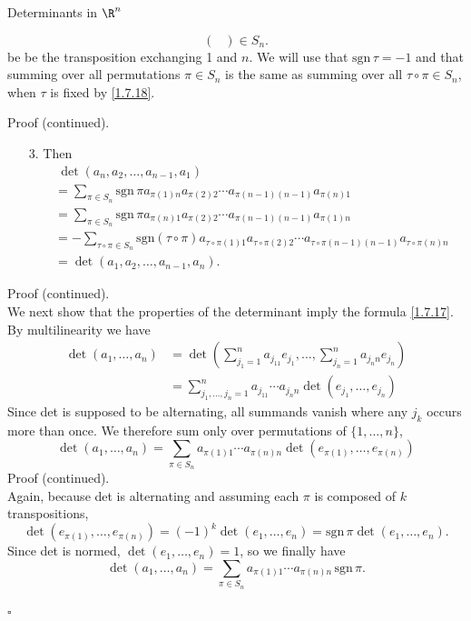 \documentclass[smaller,hyperref={CJKbookmarks=true}]{beamer}
\begin{document}
\begin{frame}{Determinants in $\R^n$}
\begin{spacing}{1.05}
\begin{itemize}
\begin{equation}
\begin{pmatrix}
             \end{pmatrix}\in S_n.
      \end{equation}
      be be the transposition exchanging 1 and $n$. We will use that $\text{sgn}\,\tau=-1$
      and that summing over all permutations $\pi\in S_n$ is the same as summing over all $\tau\circ\pi\in S_n$, when $\tau$ is fixed by \eqref{1.7.18}.
\end{itemize}
\newpage
\vspace*{20pt}
\alert{Proof (continued).}\\
\begin{itemize}
  \item[3.] Then
  \begin{equation*}
    \begin{split}
         &~\det(a_n,a_2,\ldots,a_{n-1},a_1)  \\
         &=\sum_{\pi\in S_n}\text{sgn}\,\pi a_{\pi(1)n}a_{\pi(2)2}\cdots a_{\pi(n-1)(n-1)}a_{\pi(n)1}  \\
         &=\sum_{\pi\in S_n}\text{sgn}\,\pi a_{\pi(n)1}a_{\pi(2)2}\cdots a_{\pi(n-1)(n-1)}a_{\pi(1)n}  \\
         &=-\sum_{\tau\circ\pi\in S_n}\text{sgn}(\tau\circ\pi)a_{\tau\circ\pi(1)1}a_{\tau\circ\pi(2)2}\cdots a_{\tau\circ\pi(n-1)(n-1)}a_{\tau\circ\pi(n)n}  \\
         &=\det(a_1,a_2,\ldots,a_{n-1},a_n).
    \end{split}
  \end{equation*}
\end{itemize}
\newpage
\alert{Proof (continued).}\\
We next show that the properties of the determinant imply the formula \eqref{1.7.17}. By multilinearity we have
\begin{equation*}
  \begin{split}
     \det(a_1,\ldots,a_n) &=\det\left(\sum_{j_1=1}^{n}a_{j_11}e_{j_1},\ldots,\sum_{j_n=1}^{n}a_{j_nn}e_{j_n}\right) \\
       &=\sum_{j_1,\ldots,j_n=1}^{n}a_{j_11}\cdots a_{j_nn}\det(e_{j_1},\ldots,e_{j_n})
  \end{split}
\end{equation*}
Since det is supposed to be alternating, all summands vanish where any $j_k$ occurs more than once. We therefore sum only over permutations of
$\{1,\ldots,n\}$,
\[\det(a_1,\ldots,a_n)=\sum_{\pi\in S_n}a_{\pi(1)1}\cdots a_{\pi(n)n}\det(e_{\pi(1)},\ldots,e_{\pi(n)})\]
\newpage
\alert{Proof (continued).}\\
Again, because det is alternating and assuming each $\pi$ is composed of $k$ transpositions,
\[\det(e_{\pi(1)},\ldots,e_{\pi(n)})=(-1)^{k}\det(e_1,\ldots,e_n)=\text{sgn}\,\pi\det(e_1,\ldots,e_n).\]
Since det is normed, $\det(e_1,\ldots,e_n)=1$, so we finally have
\[\det(a_1,\ldots,a_n)=\sum_{\pi\in S_n}a_{\pi(1)1}\cdots a_{\pi(n)n}\,\text{sgn}\,\pi.\]
\begin{flushright}
  $\square$
\end{flushright}
\end{spacing}
\end{frame}
\end{document}
